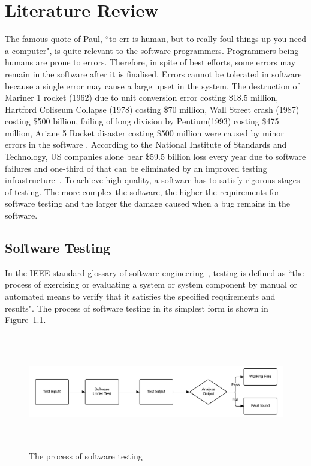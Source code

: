 
\chapter{Literature Review}
\label{chap:softwareTesting}
The famous quote of Paul, ``to err is human, but to really foul things up you need a computer", is quite relevant to the software programmers. Programmers being humans are prone to errors. Therefore, in spite of best efforts, some errors may remain in the software after it is finalised.  Errors cannot be tolerated in software because a single error may cause a large upset in the system. The destruction of Mariner 1 rocket (1962) due to unit conversion error costing \$18.5 million, Hartford Coliseum Collapse (1978) costing \$70 million, Wall Street crash (1987) costing \$500 billion, failing of long division by Pentium\texttrademark (1993) costing \$475 million, Ariane 5 Rocket disaster costing \$500 million were caused by minor errors in the software \cite{toweysoftware}. According to the National Institute of Standards and Technology, US companies alone bear \$59.5 billion loss every year due to software failures and one-third of that can be eliminated by an improved testing infrastructure~\cite{tassey2002economic}. To achieve high quality, a software has to satisfy rigorous stages of testing. The more complex the software, the higher the requirements for software testing and the larger the damage caused when a bug remains in the software.

\section{Software Testing}
In the IEEE standard glossary of software engineering~\cite{american1984}, testing is defined as ``the process of exercising or evaluating a system or system component by manual or automated means to verify that it satisfies the specified requirements and results". The process of software testing in its simplest form is shown in Figure~\ref{fig:softwareTesting}. 

\begin{figure}[h]
	\centering
	\centerline{\includegraphics[width=16cm, height=5cm]{chapter2/softwareTesting.png}}
	\caption{The process of software testing}
	\label{fig:softwareTesting}
\end{figure}

